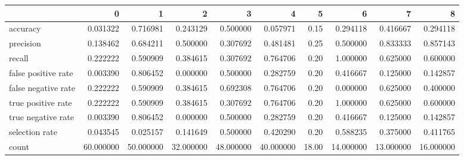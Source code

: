 \begin{tabular}{lrrrrrrrrr}
\toprule
{} &          0 &          1 &          2 &          3 &          4 &      5 &          6 &          7 &          8 \\
\midrule
accuracy            &   0.031322 &   0.716981 &   0.243129 &   0.500000 &   0.057971 &   0.15 &   0.294118 &   0.416667 &   0.294118 \\
precision           &   0.138462 &   0.684211 &   0.500000 &   0.307692 &   0.481481 &   0.25 &   0.500000 &   0.833333 &   0.857143 \\
recall              &   0.222222 &   0.590909 &   0.384615 &   0.307692 &   0.764706 &   0.20 &   1.000000 &   0.625000 &   0.600000 \\
false positive rate &   0.003390 &   0.806452 &   0.000000 &   0.500000 &   0.282759 &   0.20 &   0.416667 &   0.125000 &   0.142857 \\
false negative rate &   0.222222 &   0.590909 &   0.384615 &   0.692308 &   0.764706 &   0.20 &   0.000000 &   0.625000 &   0.400000 \\
true positive rate  &   0.222222 &   0.590909 &   0.384615 &   0.307692 &   0.764706 &   0.20 &   1.000000 &   0.625000 &   0.600000 \\
true negative rate  &   0.003390 &   0.806452 &   0.000000 &   0.500000 &   0.282759 &   0.20 &   0.416667 &   0.125000 &   0.142857 \\
selection rate      &   0.043545 &   0.025157 &   0.141649 &   0.500000 &   0.420290 &   0.20 &   0.588235 &   0.375000 &   0.411765 \\
count               &  60.000000 &  50.000000 &  32.000000 &  48.000000 &  40.000000 &  18.00 &  14.000000 &  13.000000 &  16.000000 \\
\bottomrule
\end{tabular}

